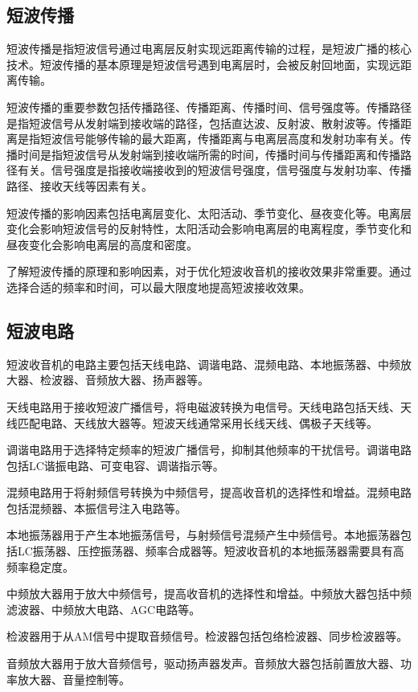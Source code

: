 \documentclass[12pt,UTF8]{ctexbook}
\begin{document}
\subsection{短波传播}

短波传播是指短波信号通过电离层反射实现远距离传输的过程，是短波广播的核心技术。短波传播的基本原理是短波信号遇到电离层时，会被反射回地面，实现远距离传输。

短波传播的重要参数包括传播路径、传播距离、传播时间、信号强度等。传播路径是指短波信号从发射端到接收端的路径，包括直达波、反射波、散射波等。传播距离是指短波信号能够传输的最大距离，传播距离与电离层高度和发射功率有关。传播时间是指短波信号从发射端到接收端所需的时间，传播时间与传播距离和传播路径有关。信号强度是指接收端接收到的短波信号强度，信号强度与发射功率、传播路径、接收天线等因素有关。

短波传播的影响因素包括电离层变化、太阳活动、季节变化、昼夜变化等。电离层变化会影响短波信号的反射特性，太阳活动会影响电离层的电离程度，季节变化和昼夜变化会影响电离层的高度和密度。

了解短波传播的原理和影响因素，对于优化短波收音机的接收效果非常重要。通过选择合适的频率和时间，可以最大限度地提高短波接收效果。

\subsection{短波电路}

短波收音机的电路主要包括天线电路、调谐电路、混频电路、本地振荡器、中频放大器、检波器、音频放大器、扬声器等。

天线电路用于接收短波广播信号，将电磁波转换为电信号。天线电路包括天线、天线匹配电路、天线放大器等。短波天线通常采用长线天线、偶极子天线等。

调谐电路用于选择特定频率的短波广播信号，抑制其他频率的干扰信号。调谐电路包括LC谐振电路、可变电容、调谐指示等。

混频电路用于将射频信号转换为中频信号，提高收音机的选择性和增益。混频电路包括混频器、本振信号注入电路等。

本地振荡器用于产生本地振荡信号，与射频信号混频产生中频信号。本地振荡器包括LC振荡器、压控振荡器、频率合成器等。短波收音机的本地振荡器需要具有高频率稳定度。

中频放大器用于放大中频信号，提高收音机的选择性和增益。中频放大器包括中频滤波器、中频放大电路、AGC电路等。

检波器用于从AM信号中提取音频信号。检波器包括包络检波器、同步检波器等。

音频放大器用于放大音频信号，驱动扬声器发声。音频放大器包括前置放大器、功率放大器、音量控制等。
\end{document}
